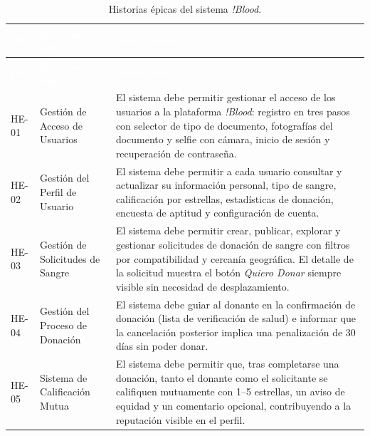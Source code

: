 \begin{longtable}{%
  |>{\bfseries\centering\arraybackslash}p{1.6cm}%
  |>{\raggedright\arraybackslash}p{4.2cm}%
  |>{\raggedright\arraybackslash}p{9.0cm}|}

\caption{Historias épicas del sistema \textit{!Blood}.}
\label{tab:historias_epicas}\\

\hline
\rowcolor{darkgray}
\textcolor{white}{\textbf{ID}} &
\textcolor{white}{\textbf{Historia Épica}} &
\textcolor{white}{\textbf{Descripción}} \\
\hline
\endfirsthead

\hline
\rowcolor{darkgray}
\textcolor{white}{\textbf{ID}} &
\textcolor{white}{\textbf{Historia Épica}} &
\textcolor{white}{\textbf{Descripción}} \\
\hline
\endhead

\hline
\endfoot

\hline
\endlastfoot

HE-01 &
Gestión de Acceso de Usuarios &
El sistema debe permitir gestionar el acceso de los usuarios a la plataforma
\textit{!Blood}: registro en tres pasos con selector de tipo de documento, fotografías del
documento y selfie con cámara, inicio de sesión y recuperación de contraseña. \\
\hline

HE-02 &
Gestión del Perfil de Usuario &
El sistema debe permitir a cada usuario consultar y actualizar su información personal,
tipo de sangre, calificación por estrellas, estadísticas de donación, encuesta de aptitud
y configuración de cuenta. \\
\hline

HE-03 &
Gestión de Solicitudes de Sangre &
El sistema debe permitir crear, publicar, explorar y gestionar solicitudes de donación de
sangre con filtros por compatibilidad y cercanía geográfica. El detalle de la solicitud
muestra el botón \textit{Quiero Donar} siempre visible sin necesidad de desplazamiento. \\
\hline

HE-04 &
Gestión del Proceso de Donación &
El sistema debe guiar al donante en la confirmación de donación (lista de verificación de
salud) e informar que la cancelación posterior implica una penalización de 30 días sin
poder donar. \\
\hline

HE-05 &
Sistema de Calificación Mutua &
El sistema debe permitir que, tras completarse una donación, tanto el donante como el
solicitante se califiquen mutuamente con 1--5 estrellas, un aviso de equidad y un
comentario opcional, contribuyendo a la reputación visible en el perfil. \\
\hline


\end{longtable}
